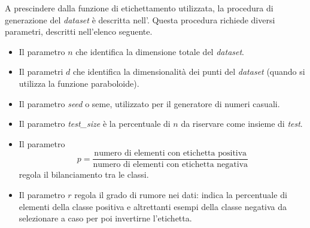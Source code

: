 A prescindere dalla funzione di etichettamento utilizzata, la procedura di generazione del \emph{dataset} è descritta nell'.
Questa procedura richiede diversi parametri, descritti nell'elenco seguente.
\begin{itemize}
    \item Il parametro $n$ che identifica la dimensione totale del \emph{dataset}.
    \item Il parametri $d$ che identifica la dimensionalità dei punti del \emph{dataset} (quando si utilizza la funzione paraboloide). 
    \item Il parametro \emph{seed} o seme, utilizzato per il generatore di numeri casuali.
    \item Il parametro \emph{test\_size} è la percentuale di $n$ da riservare come insieme di \emph{test}.
    \item Il parametro 
    \begin{equation*}
        p = \frac{\text{numero di elementi con etichetta positiva}}{\text{numero di elementi con etichetta negativa}}
    \end{equation*} 
    regola il bilanciamento tra le classi.
    \item Il parametro $r$ regola il grado di rumore nei dati: indica la percentuale di elementi della classe positiva e altrettanti esempi della classe negativa da selezionare a caso per poi invertirne l'etichetta.
\end{itemize}
